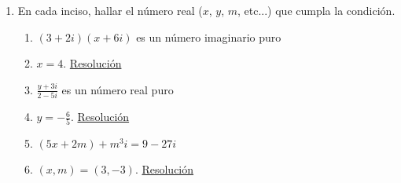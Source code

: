 \documentclass[a4paper]{article}
\newcommand{\answer}{\item[**]}
\newcommand{\exercise}{\item}
\newcommand{\df}[2]{\displaystyle\frac{#1}{#2}}
\newcommand{\conj}[1]{\overline{#1}}
\begin{document}
\begin{enumerate}
\begin{multicols}{2}
\begin{enumerate} [label=(\alph*)]
		\item $\conj{i.z}=-i.\conj{z}$
		\answer Desarrollando el lado izquierdo se obtiene $\conj{i.z}=\conj{i(a+bi)}=\conj{ai+bi^2}=\conj{-b+ai}=-b-ai$. Desarrollando el lado derecho se obtiene $-i.\conj{z}=-i(a-bi)=-ai+bi^2=-b-ai$, que es lo mismo.

		\item $z.\conj{z}=|z|^2$
		\answer Por el lado izquierdo tenemos: $z.\conj{z}=(a+bi)(a-bi)=a^2-(bi)^2=a^2-b^2 i^2=a^2+b^2$. Por el lado derecho tenemos $|z|^2=\sqrt{a^2+b^2}^2=a^2+b^2$. Por lo tanto, son iguales.

		\item $\conj{z-w}=\conj{z}-\conj{w}$
		\item $|z.(1+2i)|^2=(|z|.|3+4i|)^2$
		\item $z+\conj{z} \in \mathbb{R}$
		\item $z-\conj{z} \not\in \mathbb{R}$

		\item $|z-w|=d(z,w)$
		\answer Geometricamente la distancia entre le punto de $z$ y el de $w$ se puede calcular por Teorema de Pitágoras y da $d(z,w)=\sqrt{(a-c)^2+(b-d)^2}$. Si calculamos $z-w=(a-c)+(b-d)i$ podemos ver que su módulo es $|z-w|=\sqrt{(a-c)^2+(b-d)^2}$, que es lo mismo.

	\end{enumerate}
	\end{multicols}

	\exercise En cada inciso, hallar el número real ($x$, $y$, $m$, etc...) que cumpla la condición.
	\begin{enumerate} [label=(\alph*)]
		
		\item $(3+2i)(x+6i)$ es un número imaginario puro
		\answer $x=4$. \href{https://youtu.be/rZMja-gZ3q0}{Resolución}

		\item $\df{y+3i}{2-5i}$ es un número real puro
		\answer $y=-\df{6}{5}$. \href{https://youtu.be/cgQsvNewGZ0}{Resolución}

		\item $(5x+2m)+m^3i = 9-27i$
		\answer $(x,m)=(3,-3)$. \href{https://youtu.be/kQmzdYU4EsY}{Resolución}

	\end{enumerate}


\end{enumerate}
\end{document}
